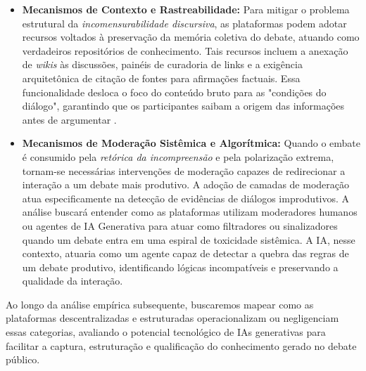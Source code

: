 \documentclass[conference]{IEEEtran} \IEEEoverridecommandlockouts %
\begin{document}
\begin{itemize}
    \item \textbf{Mecanismos de Contexto e Rastreabilidade:} Para mitigar o problema estrutural da \textit{incomensurabilidade discursiva}, as plataformas podem adotar recursos voltados à preservação da memória coletiva do debate, atuando como verdadeiros repositórios de conhecimento. Tais recursos incluem a anexação de \textit{wikis} às discussões, painéis de curadoria de links e a exigência arquitetônica de citação de fontes para afirmações factuais. Essa funcionalidade desloca o foco do conteúdo bruto para as "condições do diálogo", garantindo que os participantes saibam a origem das informações antes de argumentar \cite{angenot2008dialogues}.

    \item \textbf{Mecanismos de Moderação Sistêmica e Algorítmica:} Quando o embate é consumido pela \textit{retórica da incompreensão} e pela polarização extrema, tornam-se necessárias intervenções de moderação capazes de redirecionar a interação a um debate mais produtivo. A adoção de camadas de moderação atua especificamente na detecção de evidências de diálogos improdutivos. A análise buscará entender como as plataformas utilizam moderadores humanos ou agentes de IA Generativa para atuar como filtradores ou sinalizadores quando um debate entra em uma espiral de toxicidade sistêmica. A IA, nesse contexto, atuaria como um agente capaz de detectar a quebra das regras de um debate produtivo, identificando lógicas incompatíveis e preservando a qualidade da interação.

\end{itemize}


Ao longo da análise empírica subsequente, buscaremos mapear como as plataformas descentralizadas e estruturadas operacionalizam ou negligenciam essas categorias, avaliando o potencial tecnológico de IAs generativas para facilitar a captura, estruturação e qualificação do conhecimento gerado no debate público.
\end{document}
